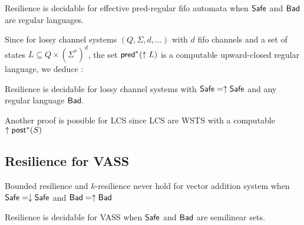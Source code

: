 \begin{theorem}{}
Resilience is decidable for effective pred-regular fifo automata when $\textsf{Safe}$ and $\textsf{Bad}$ are regular languages.
\end{theorem} 

%

Since for lossy channel systems $(Q, \Sigma,d,...)$ with $d$ fifo channels and a set of states $L \subseteq Q \times (\Sigma^*)^d$, the set $\textsf{pred}^*(\uparrow L)$ is a computable upward-closed regular language, we deduce :

\begin{corollary}
Resilience is decidable for lossy channel systems with $\textsf{Safe}=\uparrow \textsf{Safe}$ and any regular language $\textsf{Bad}$.
\end{corollary}

Another proof is possible for LCS since LCS are WSTS with a computable $\uparrow \textsf{post}^*(S)$ 
%
\subsection{Resilience for VASS}





\begin{proposition}
{\sc Bounded resilience} and {\sc $k$-resilience} never hold for vector addition system when $\textsf{Safe} = \downarrow \textsf{Safe}$ and $\textsf{Bad} = \uparrow \textsf{Bad}$
\end{proposition}


\begin{theorem}{}
Resilience is decidable for VASS when $\textsf{Safe}$ and $\textsf{Bad}$ are semilinear sets.
\end{theorem}

